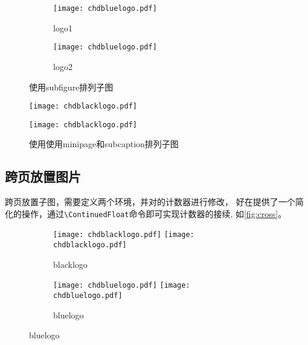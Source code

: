 \begin{figure}
  \centering
  \begin{subfigure}{.3\linewidth}
    \centering
    \texttt{[image: chdbluelogo.pdf]}
    \caption{logo1}
  \end{subfigure}
  \begin{subfigure}{.3\linewidth}
    \centering
    \texttt{[image: chdbluelogo.pdf]}
    \caption{logo2}
  \end{subfigure}
  \caption{使用\textsf{subfigure}排列子图}
\end{figure}

\begin{figure}
  \centering
  \begin{minipage}{.3\linewidth}
    \centering
    \texttt{[image: chdblacklogo.pdf]}
  \end{minipage}
  \centering
  \begin{minipage}{.3\linewidth}
    \centering
    \texttt{[image: chdblacklogo.pdf]}
  \end{minipage}
  \caption{使用使用\textsf{minipage}和\textsf{subcaption}排列子图}
\end{figure}

\subsection{跨页放置图片}

跨页放置子图，需要定义两个环境，并对的计数器进行修改，
好在提供了一个简化的操作，通过\verb|\ContinuedFloat|命令即可实现计数器的接续,
如\autoref{fig:cross}。
\begin{figure}[b]
  \centering
  \begin{subfigure}{\linewidth}
    \centering
    \texttt{[image: chdblacklogo.pdf]}
    \hspace{1cm}
    \texttt{[image: chdblacklogo.pdf]}
    \caption{blacklogo}
  \end{subfigure}
  \begin{subfigure}{\linewidth}
    \centering
    \texttt{[image: chdbluelogo.pdf]}
    \hspace{1cm}
    \texttt{[image: chdbluelogo.pdf]}
    \caption{bluelogo}
  \end{subfigure}
\end{figure}

